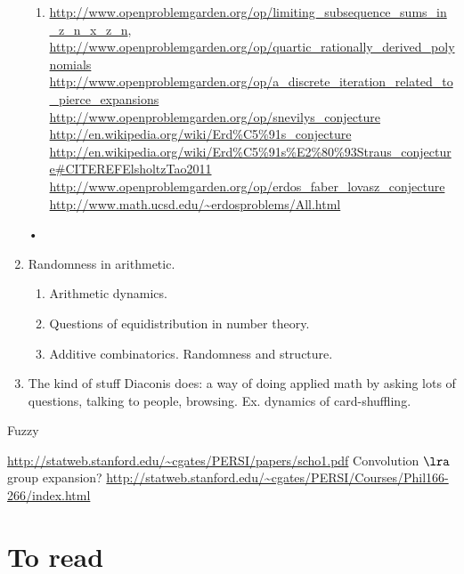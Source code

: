 \begin{enumerate}
\begin{enumerate}
\item
\url{http://www.openproblemgarden.org/op/limiting_subsequence_sums_in_z_n_x_z_n}, 
\url{http://www.openproblemgarden.org/op/quartic_rationally_derived_polynomials} 
\url{http://www.openproblemgarden.org/op/a_discrete_iteration_related_to_pierce_expansions} 
\url{http://www.openproblemgarden.org/op/snevilys_conjecture} 
\url{http://en.wikipedia.org/wiki/Erd\%C5\%91s_conjecture}
\url{http://en.wikipedia.org/wiki/Erd\%C5\%91s\%E2\%80\%93Straus_conjecture\#CITEREFElsholtzTao2011}
\url{http://www.openproblemgarden.org/op/erdos_faber_lovasz_conjecture}
\url{http://www.math.ucsd.edu/~erdosproblems/All.html}
\end{enumerate}•
\item Randomness in arithmetic.
\begin{enumerate}
\item
Arithmetic dynamics.
\item
Questions of equidistribution in number theory.
\item Additive combinatorics. Randomness and structure.
\end{enumerate}
\item The kind of stuff Diaconis does: a way of doing applied math by asking lots of questions, talking to people, browsing. Ex. dynamics of card-shuffling.
\end{enumerate}

Fuzzy

\url{http://statweb.stanford.edu/~cgates/PERSI/papers/scho1.pdf} Convolution $\lra$ group expansion?
\url{http://statweb.stanford.edu/~cgates/PERSI/Courses/Phil166-266/index.html}
\chapter{To read}

